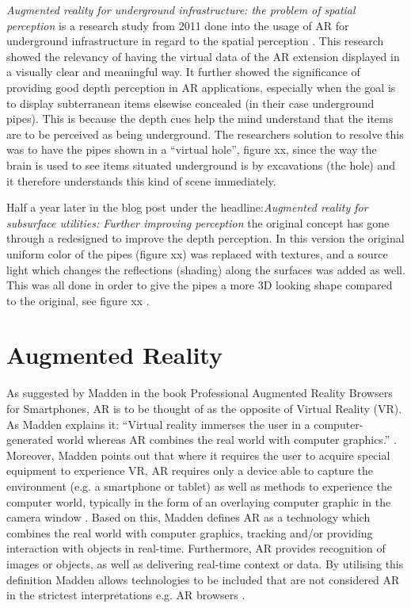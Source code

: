 \textit{Augmented reality for underground infrastructure: the problem of spatial perception} is a research study from 2011 done into the usage of AR for underground infrastructure in regard to the spatial perception . This research showed the relevancy of having the virtual data of the AR extension displayed in a visually clear and meaningful way. It further showed the significance of providing good depth perception in AR applications, especially when the goal is to display subterranean items elsewise concealed (in their case underground pipes). This is because the depth cues help the mind understand that the items are to be perceived as being underground. The researchers solution to resolve this was to have the pipes shown in a “virtual hole”, figure xx, since the way the brain is used to see items situated underground is by excavations (the hole) and it therefore understands this kind of scene immediately.


Half a year later in the blog post under the headline:\textit{Augmented reality for subsurface utilities: Further improving perception} the original concept has gone through a redesigned to improve the depth perception. In this version the original uniform color of the pipes (figure xx) was replaced with textures, and a source light which changes the reflections (shading) along the surfaces was added as well. This was all done in order to give the pipes a more 3D looking shape compared to the original, see figure xx .
\section{Augmented Reality}
As suggested by Madden in the book Professional Augmented Reality Browsers for Smartphones, AR is to be thought of as the opposite of Virtual Reality (VR). As Madden explains it: “Virtual reality immerses the user in a computer-generated world whereas AR combines the real world with computer graphics.” \cite{Madden2011}. Moreover, Madden points out that where it requires the user to acquire special equipment to experience VR, AR requires only a device able to capture the environment (e.g. a smartphone or tablet) as well as methods to experience the computer world, typically in the form of an overlaying computer graphic in the camera window \cite{Madden2011}. Based on this, Madden defines AR as a technology which combines the real world with computer graphics, tracking and/or providing interaction with objects in real-time. Furthermore, AR provides recognition of images or objects, as well as delivering real-time context or data. By utilising this definition Madden allows technologies to be included that are not considered AR in the strictest interpretations e.g. AR browsers \cite{Madden2011}.


